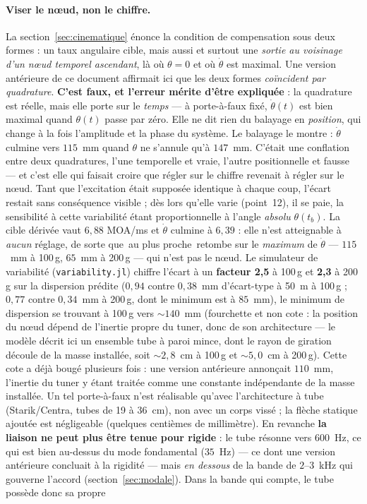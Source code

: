 \documentclass[12pt,a4paper]{article}
\begin{document}
	\paragraph{Viser le n\oe{}ud, non le chiffre.} La section~\ref{sec:cinematique} \'enonce la condition de compensation sous deux formes : un taux angulaire cible, mais aussi et surtout une \emph{sortie au voisinage d'un n\oe{}ud temporel ascendant}, l\`a o\`u $\theta = 0$ et o\`u $\dot\theta$ est maximal. Une version ant\'erieure de ce document affirmait ici que les deux formes \emph{co\"incident par quadrature}. \textbf{C'est faux, et l'erreur m\'erite d'\^etre expliqu\'ee} : la quadrature est r\'eelle, mais elle porte sur le \emph{temps} --- \`a porte-\`a-faux fix\'e, $\dot\theta(t)$ est bien maximal quand $\theta(t)$ passe par z\'ero. Elle ne dit rien du balayage en \emph{position}, qui change \`a la fois l'amplitude et la phase du syst\`eme. Le balayage le montre : $\dot\theta$ culmine vers $115$~mm quand $\theta$ ne s'annule qu'\`a $147$~mm. C'\'etait une conflation entre deux quadratures, l'une temporelle et vraie, l'autre positionnelle et fausse --- et c'est elle qui faisait croire que r\'egler sur le chiffre revenait \`a r\'egler sur le n\oe{}ud. Tant que l'excitation \'etait suppos\'ee identique \`a chaque coup, l'\'ecart restait sans cons\'equence visible ; d\`es lors qu'elle varie (point~12), il se paie, la sensibilit\'e \`a cette variabilit\'e \'etant proportionnelle \`a l'angle \emph{absolu} $\theta(t_b)$. La cible d\'eriv\'ee vaut $6{,}88$ MOA/ms et $\dot\theta$ culmine \`a $6{,}39$ : elle n'est atteignable \`a \emph{aucun} r\'eglage, de sorte que \og\,au plus proche\,\fg{} retombe sur le \emph{maximum} de $\dot\theta$ --- $115$~mm \`a 100\,g, $65$~mm \`a 200\,g --- qui n'est pas le n\oe{}ud. Le simulateur de variabilit\'e (\texttt{variability.jl}) chiffre l'\'ecart \`a un \textbf{facteur 2,5} \`a 100\,g et \textbf{2,3} \`a 200\,g sur la dispersion pr\'edite ($0{,}94$ contre $0{,}38$~mm d'\'ecart-type \`a 50~m \`a 100\,g ; $0{,}77$ contre $0{,}34$~mm \`a 200\,g, dont le minimum est \`a $85$~mm), le minimum de dispersion se trouvant \`a 100\,g vers $\sim 140$~mm (fourchette et non cote : la position du n\oe{}ud d\'epend de l'inertie propre du tuner, donc de son architecture --- le mod\`ele d\'ecrit ici un ensemble tube \`a paroi mince, dont le rayon de giration d\'ecoule de la masse install\'ee, soit $\sim 2{,}8$~cm \`a 100\,g et $\sim 5{,}0$~cm \`a 200\,g). Cette cote a d\'ej\`a boug\'e plusieurs fois : une version ant\'erieure annon\c{c}ait $110$~mm, l'inertie du tuner y \'etant trait\'ee comme une constante ind\'ependante de la masse install\'ee. Un tel porte-\`a-faux n'est r\'ealisable qu'avec l'architecture \`a tube (Starik/Centra, tubes de 19 \`a 36~cm), non avec un corps viss\'e ; la fl\`eche statique ajout\'ee est n\'egligeable (quelques centi\`emes de millim\`etre). En revanche \textbf{la liaison ne peut plus \^etre tenue pour rigide} : le tube r\'esonne vers $600$~Hz, ce qui est bien au-dessus du mode fondamental ($35$~Hz) --- ce dont une version ant\'erieure concluait \`a la rigidit\'e --- mais \emph{en dessous} de la bande de $2$--$3$~kHz qui gouverne l'accord (section~\ref{sec:modale}). Dans la bande qui compte, le tube poss\`ede donc sa propre 
\end{document}
